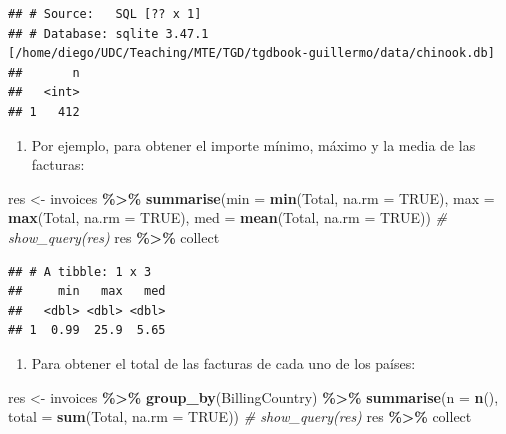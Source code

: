 \documentclass[
]{book}
\newenvironment{Shaded}{\begin{snugshade}}{\end{snugshade}}
\newcommand{\AttributeTok}[1]{\textcolor[rgb]{0.13,0.29,0.53}{#1}}
\newcommand{\CommentTok}[1]{\textcolor[rgb]{0.56,0.35,0.01}{\textit{#1}}}
\newcommand{\ConstantTok}[1]{\textcolor[rgb]{0.56,0.35,0.01}{#1}}
\newcommand{\FunctionTok}[1]{\textcolor[rgb]{0.13,0.29,0.53}{\textbf{#1}}}
\newcommand{\NormalTok}[1]{#1}
\newcommand{\OtherTok}[1]{\textcolor[rgb]{0.56,0.35,0.01}{#1}}
\newcommand{\SpecialCharTok}[1]{\textcolor[rgb]{0.81,0.36,0.00}{\textbf{#1}}}
\providecommand{\tightlist}{%
  \setlength{\itemsep}{0pt}\setlength{\parskip}{0pt}}
\begin{document}
\begin{verbatim}
## # Source:   SQL [?? x 1]
## # Database: sqlite 3.47.1 [/home/diego/UDC/Teaching/MTE/TGD/tgdbook-guillermo/data/chinook.db]
##       n
##   <int>
## 1   412
\end{verbatim}

\begin{enumerate}
\def\labelenumi{\arabic{enumi}.}
\setcounter{enumi}{1}
\tightlist
\item
  Por ejemplo, para obtener el importe mínimo, máximo y la media de las facturas:
\end{enumerate}

\begin{Shaded}
\begin{Highlighting}[]
\NormalTok{res }\OtherTok{\textless{}{-}}\NormalTok{ invoices }\SpecialCharTok{\%\textgreater{}\%} \FunctionTok{summarise}\NormalTok{(}\AttributeTok{min =} \FunctionTok{min}\NormalTok{(Total, }\AttributeTok{na.rm =} \ConstantTok{TRUE}\NormalTok{), }
                        \AttributeTok{max =} \FunctionTok{max}\NormalTok{(Total, }\AttributeTok{na.rm =} \ConstantTok{TRUE}\NormalTok{), }
                        \AttributeTok{med =} \FunctionTok{mean}\NormalTok{(Total, }\AttributeTok{na.rm =} \ConstantTok{TRUE}\NormalTok{))}
\CommentTok{\# show\_query(res)}
\NormalTok{res  }\SpecialCharTok{\%\textgreater{}\%}\NormalTok{ collect}
\end{Highlighting}
\end{Shaded}

\begin{verbatim}
## # A tibble: 1 x 3
##     min   max   med
##   <dbl> <dbl> <dbl>
## 1  0.99  25.9  5.65
\end{verbatim}

\begin{enumerate}
\def\labelenumi{\arabic{enumi}.}
\setcounter{enumi}{2}
\tightlist
\item
  Para obtener el total de las facturas de cada uno de los países:
\end{enumerate}

\begin{Shaded}
\begin{Highlighting}[]
\NormalTok{res }\OtherTok{\textless{}{-}}\NormalTok{ invoices }\SpecialCharTok{\%\textgreater{}\%} \FunctionTok{group\_by}\NormalTok{(BillingCountry) }\SpecialCharTok{\%\textgreater{}\%} 
          \FunctionTok{summarise}\NormalTok{(}\AttributeTok{n =} \FunctionTok{n}\NormalTok{(), }\AttributeTok{total =} \FunctionTok{sum}\NormalTok{(Total, }\AttributeTok{na.rm =} \ConstantTok{TRUE}\NormalTok{))}
\CommentTok{\# show\_query(res)}
\NormalTok{res  }\SpecialCharTok{\%\textgreater{}\%}\NormalTok{ collect}
\end{Highlighting}
\end{Shaded}
\end{document}
